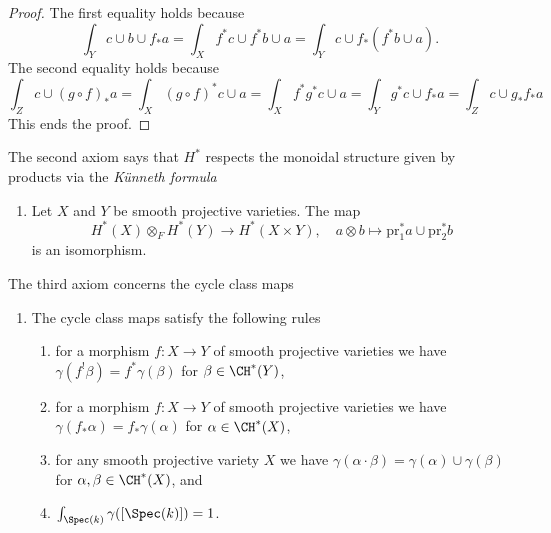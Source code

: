 \begin{proof}
The first equality holds because
$$
\int_Y c \cup b \cup f_*a =
\int_X f^*c \cup f^*b \cup a =
\int_Y c \cup f_*(f^*b \cup a).
$$
The second equality holds because
$$
\int_Z c \cup (g \circ f)_*a = \int_X (g \circ f)^*c \cup a =
\int_X f^* g^* c \cup a = \int_Y g^*c \cup f_*a = \int_Z c \cup g_*f_*a
$$
This ends the proof.
\end{proof}

The second axiom says that $H^*$ respects the monoidal structure
given by products via the {\it K\"unneth formula}
\begin{enumerate}
\item[(B)] Let $X$ and $Y$ be smooth projective varieties. The map
$$
H^*(X) \otimes_F H^*(Y) \to H^*(X \times Y),\quad
a \otimes b \mapsto \text{pr}_1^*a \cup \text{pr}_2^*b
$$
is an isomorphism.
\end{enumerate}
The third axiom concerns the cycle class maps
\begin{enumerate}
\item[(C)] The cycle class maps satisfy the following rules
\begin{enumerate}
\item for a morphism $f : X \to Y$ of smooth projective varieties
we have $\gamma(f^!\beta) = f^*\gamma(\beta)$ for $\beta \in \CH^*(Y)$,
\item for a morphism $f : X \to Y$ of smooth projective varieties we have
$\gamma(f_*\alpha) = f_*\gamma(\alpha)$ for $\alpha \in \CH^*(X)$,
\item for any smooth projective variety $X$ we have
$\gamma(\alpha \cdot \beta) = \gamma(\alpha) \cup \gamma(\beta)$
for $\alpha, \beta \in \CH^*(X)$, and
\item $\int_{\Spec(k)} \gamma([\Spec(k)]) = 1$.
\end{enumerate}
\end{enumerate}

